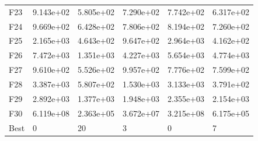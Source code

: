 \begin{tabular}{llllll}
F23  &  9.143e+02 &  5.805e+02 &  7.290e+02 &  7.742e+02 &  6.317e+02 \\
F24  &  9.669e+02 &  6.428e+02 &  7.806e+02 &  8.194e+02 &  7.260e+02 \\
F25  &  2.165e+03 &  4.643e+02 &  9.647e+02 &  2.964e+03 &  4.162e+02 \\
F26  &  7.472e+03 &  1.351e+03 &  4.227e+03 &  5.654e+03 &  4.774e+03 \\
F27  &  9.610e+02 &  5.526e+02 &  9.957e+02 &  7.776e+02 &  7.599e+02 \\
F28  &  3.387e+03 &  5.807e+02 &  1.530e+03 &  3.133e+03 &  3.791e+02 \\
F29  &  2.892e+03 &  1.377e+03 &  1.948e+03 &  2.355e+03 &  2.154e+03 \\
F30  &  6.119e+08 &  2.363e+05 &  3.672e+07 &  3.215e+08 &  6.175e+05 \\
Best &          0 &         20 &          3 &          0 &          7 \\
\bottomrule
\end{tabular}
